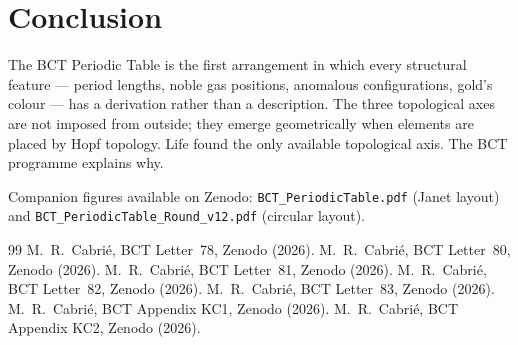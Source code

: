 \documentclass[aps,prl,twocolumn,superscriptaddress,floatfix]{revtex4-2}
\begin{document}
\section{Conclusion}

The BCT Periodic Table is the first arrangement in which every
structural feature --- period lengths, noble gas positions,
anomalous configurations, gold's colour --- has a derivation
rather than a description. The three topological axes are not
imposed from outside; they emerge geometrically when elements
are placed by Hopf topology. Life found the only available
topological axis. The BCT programme explains why.

Companion figures available on Zenodo:
\texttt{BCT\_PeriodicTable.pdf} (Janet layout) and
\texttt{BCT\_PeriodicTable\_Round\_v12.pdf} (circular layout).

\begin{thebibliography}{99}
 M.~R.~Cabri\'{e}, BCT Letter~78, Zenodo (2026).
 M.~R.~Cabri\'{e}, BCT Letter~80, Zenodo (2026).
 M.~R.~Cabri\'{e}, BCT Letter~81, Zenodo (2026).
 M.~R.~Cabri\'{e}, BCT Letter~82, Zenodo (2026).
 M.~R.~Cabri\'{e}, BCT Letter~83, Zenodo (2026).
 M.~R.~Cabri\'{e}, BCT Appendix KC1, Zenodo (2026).
 M.~R.~Cabri\'{e}, BCT Appendix KC2, Zenodo (2026).
\end{thebibliography}
\end{document}
